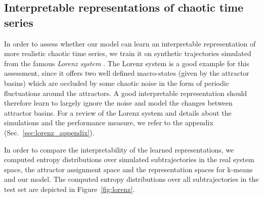 \subsection{Interpretable representations of chaotic time series} \label{sec:lorenz}

In order to assess whether our model can learn an interpretable representation of more realistic chaotic time series, we train it on synthetic trajectories simulated from the famous \emph{Lorenz system} \citep{Lorenz1963}.
The Lorenz system is a good example for this assessment, since it offers two well defined macro-states (given by the attractor basins) which are occluded by some chaotic noise in the form of periodic fluctuations around the attractors.
A good interpretable representation should therefore learn to largely ignore the noise and model the changes between attractor basins.
For a review of the Lorenz system and details about the simulations and the performance measure, we refer to the appendix (Sec.~\ref{sec:lorenz_appendix}).

In order to compare the interpretability of the learned representations, we computed entropy distributions over simulated subtrajectories in the real system space, the attractor assignment space and the representation spaces for k-means and our model.
The computed entropy distributions over all subtrajectories in the test set are depicted in Figure~\ref{fig:lorenz}. 

